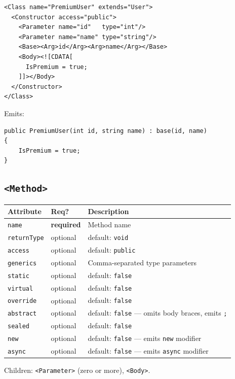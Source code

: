 \documentclass[11pt,a4paper]{article}
\newcommand{\el}[1]{\texttt{\textcolor{xoop-keyword}{<#1>}}}
\newcommand{\attr}[1]{\texttt{\textcolor{xoop-attr}{#1}}}
\newcommand{\cs}[1]{\texttt{#1}}
\newcommand{\required}{\textcolor{xoop-red}{\textbf{required}}}
\newcommand{\optional}{\textcolor{xoop-green}{optional}}
\newcommand{\default}[1]{\textcolor{xoop-green}{default: \texttt{#1}}}
\begin{document}
\begin{lstlisting}[caption={Constructor with base call}]
<Class name="PremiumUser" extends="User">
  <Constructor access="public">
    <Parameter name="id"   type="int"/>
    <Parameter name="name" type="string"/>
    <Base><Arg>id</Arg><Arg>name</Arg></Base>
    <Body><![CDATA[
      IsPremium = true;
    ]]></Body>
  </Constructor>
</Class>
\end{lstlisting}

Emits:
\begin{lstlisting}[style=csstyle, numbers=none]
public PremiumUser(int id, string name) : base(id, name)
{
    IsPremium = true;
}
\end{lstlisting}

\subsection{\el{Method}}

\begin{center}
\begin{tabularx}{\linewidth}{llX}
\toprule
Attribute & Req? & Description \\
\midrule
\attr{name}       & \required & Method name \\
\attr{returnType} & \optional & \default{void} \\
\attr{access}     & \optional & \default{public} \\
\attr{generics}   & \optional & Comma-separated type parameters \\
\attr{static}     & \optional & \default{false} \\
\attr{virtual}    & \optional & \default{false} \\
\attr{override}   & \optional & \default{false} \\
\attr{abstract}   & \optional & \default{false} — omits body braces, emits \texttt{;} \\
\attr{sealed}     & \optional & \default{false} \\
\attr{new}        & \optional & \default{false} — emits \cs{new} modifier \\
\attr{async}      & \optional & \default{false} — emits \cs{async} modifier \\
\bottomrule
\end{tabularx}
\end{center}

Children: \el{Parameter} (zero or more), \el{Body}.
\end{document}
